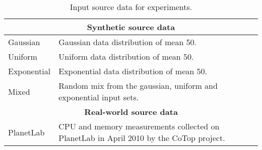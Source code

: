 \begin{table}[h!]
   \hspace{0.8cm}
   \renewcommand{\arraystretch}{1.5}
  \begin{tabular}{|m{3cm}|p{12cm}|} 
  \hline
  \multicolumn{2}{|c|}{\bf Synthetic source data} \\ 
  
    \hline\hline
	Gaussian
	& 
	Gaussian data distribution of mean 50. \\
    \hline
	
	Uniform
	&
	Uniform data distribution of mean 50.
	\\
    \hline
	
	Exponential
	&
	Exponential data distribution of mean 50.
	\\
	\hline
	
	Mixed
	&
	Random mix from the gaussian, uniform and exponential input sets.
	\\
    \hline\hline
    
    \multicolumn{2}{|c|}{\bf Real-world source data} \\ 
    \hline\hline
	PlanetLab
	&	
	CPU and memory measurements collected on PlanetLab in April 2010 by the CoTop project. 
	\\
    \hline    
  \end{tabular}
  \caption{Input source data for experiments.}
  \label{table:inputs}
\end{table}
